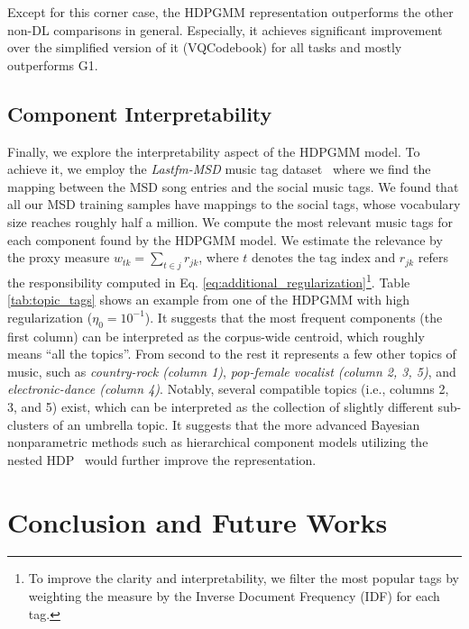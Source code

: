 \documentclass{article}
\begin{document}
Except for this corner case, the HDPGMM representation outperforms the other non-DL comparisons in general. Especially, it achieves significant improvement over the simplified version of it (VQCodebook) for all tasks and mostly outperforms G1.


\subsection{Component Interpretability}\label{sec:result_discussion:interpretability}

Finally, we explore the interpretability aspect of the HDPGMM model. To achieve it, we employ the \emph{Lastfm-MSD} music tag dataset~\cite{Bertin-Mahieux2011} where we find the mapping between the MSD song entries and the social music tags. We found that all our MSD training samples have mappings to the social tags, whose vocabulary size reaches roughly half a million. We compute the most relevant music tags for each component found by the HDPGMM model. We estimate the relevance by the proxy measure $w_{tk} = \sum_{t\in{j}}r_{jk}$, where $t$ denotes the tag index and $r_{jk}$ refers the responsibility computed in Eq. \ref{eq:additional_regularization}\footnote{To improve the clarity and interpretability, we filter the most popular tags by weighting the measure by the Inverse Document Frequency (IDF) for each tag.}. Table \ref{tab:topic_tags} shows an example from one of the HDPGMM with high regularization ($\eta_{0}=10^{-1}$). It suggests that the most frequent components (the first column) can be interpreted as the corpus-wide centroid, which roughly means ``all the topics''. From second to the rest it represents a few other topics of music, such as \emph{country-rock (column 1)}, \emph{pop-female vocalist (column 2, 3, 5)}, and \emph{electronic-dance (column 4)}. Notably, several compatible topics (i.e., columns 2, 3, and 5) exist, which can be interpreted as the collection of slightly different sub-clusters of an umbrella topic. It suggests that the more advanced Bayesian nonparametric methods such as hierarchical component models utilizing the nested HDP~\cite{DBLP:journals/pami/PaisleyWBJ15} would further improve the representation.


\section{Conclusion and Future Works}\label{sec:conclusion}
\end{document}
